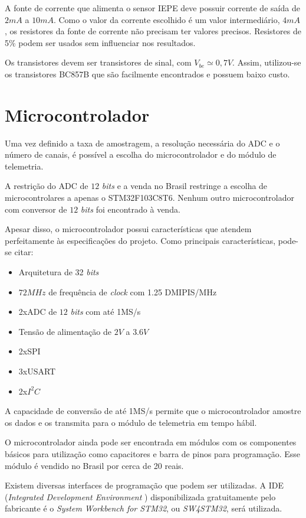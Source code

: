 \documentclass[
	12pt,				%
	openright,			%
	twoside,			%
	a4paper,			%
	english,			%
	french,				%
	spanish,			%
	brazil,				%
	]{abntex2}
\begin{document}
		A fonte de corrente que alimenta o sensor IEPE deve possuir
		corrente de saída de $2mA$ a $10mA$. Como o valor da corrente
		escolhido é um valor intermediário, $4mA$, os resistores da
		fonte de corrente não precisam ter valores precisos. Resistores
		de 5\% podem ser usados sem influenciar nos resultados.

		Os transistores devem ser transistores de sinal, com
		$V_{be}\simeq 0,7V$. Assim, utilizou-se os transistores BC857B
		que são facilmente encontrados e possuem baixo custo.

	\section{Microcontrolador}
		Uma vez definido a taxa de amostragem, a resolução necessária do
		ADC e o número de canais, é possível a escolha do
		microcontrolador e do módulo de telemetria.

		A restrição do ADC de $12$ \textit{bits} e a venda no Brasil
		restringe a escolha de microcontrolares a apenas o
		STM32F103C8T6.\cite{stm} Nenhum outro microcontrolador com conversor de
		$12$ \textit{bits} foi encontrado à venda.

		Apesar disso, o microcontrolador possui características que
		atendem perfeitamente às especificações do projeto. Como
		principais características, pode-se citar:

		\begin{itemize}
			\item Arquitetura de 32 \textit{bits}
			\item $72MHz$ de frequência de \textit{clock} com 1.25 DMIPIS/MHz
			\item 2xADC de $12$ \textit{bits} com até 1MS/s
			\item Tensão de alimentação de $2V$ a $3.6V$
			\item 2xSPI
			\item 3xUSART
			\item 2x$I^2C$
		\end{itemize}

		A capacidade de conversão de até 1MS/s permite que o
		microcontrolador amostre os dados e os transmita para o módulo
		de telemetria em tempo hábil.
		
		O microcontrolador ainda pode ser encontrada em módulos com os
		componentes básicos para utilização como capacitores e barra de
		pinos para programação. Esse módulo é vendido no Brasil por
		cerca de 20 reais.

		Existem diversas interfaces de programação que podem ser
		utilizadas. A IDE (\textit{Integrated Development Environment })
		disponibilizada gratuitamente pelo fabricante é o \textit{System
		Workbench for STM32}, ou \textit{SW4STM32}, será utilizada.
\end{document}
